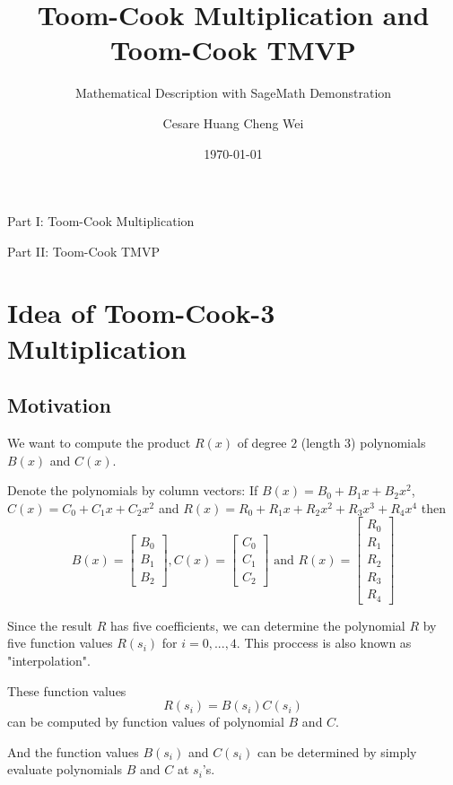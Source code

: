 \documentclass[
11pt,notheorems,hyperref={pdfauthor=whatever}
]{beamer}
\title[
]{Toom-Cook Multiplication and Toom-Cook TMVP}
\subtitle{Mathematical Description with SageMath Demonstration}
\author[
Cesare
]{
    Cesare Huang Cheng Wei 
}
\institute{
    Author Affiliation, \\
    University of Author}
\date{\today}
\begin{document}
{
\begin{frame}
  \titlepage
\end{frame}
}
\addtocounter{framenumber}{-1}

\begin{frame}{Part I: Toom-Cook Multiplication}
    \tableofcontents[part=1]
\end{frame}
\begin{frame}{Part II: Toom-Cook TMVP}
    \tableofcontents[part=2]
\end{frame}


\section{Idea of Toom-Cook-3 Multiplication}
\subsection{Motivation}
\begin{frame}
    We want to compute the product $R(x)$ of degree $2$ (length $3$) polynomials $B(x)$ and $C(x)$. 

    Denote the polynomials by column vectors: If $B(x) = B_{0} + B_{1}x+B_{2}x^{2}$, $C(x) = C_{0} + C_{1}x + C_{2} x^{2}$ and $R(x) = R_{0} + R_{1}x+R_{2}x^{2} + R_{3} x^{3} + R_{4} x^{4}$ then 
    \[
        B(x) = \begin{bmatrix} B_{0} \\ B_{1} \\ B_{2} \end{bmatrix}
        ,
        C(x) = \begin{bmatrix} C_{0} \\ C_{1} \\ C_{2} \end{bmatrix}
        \text{ and }
        R(x) = \begin{bmatrix} R_{0} \\ R_{1} \\ R_{2} \\ R_{3} \\ R_{4} \end{bmatrix}
    \]
\end{frame}

\begin{frame}
    Since the result $R$ has five coefficients, we can determine the polynomial $R$ by five function values $R(s_{i})$ for $i=0,...,4$.
    This proccess is also known as "interpolation".

    These function values
    \[R(s_{i}) = B(s_{i})C(s_{i})\]
    can be computed by function values of polynomial $B$ and $C$.

    And the function values $B(s_{i})$ and $C(s_{i})$ can be determined by simply evaluate polynomials $B$ and $C$ at $s_{i}$'s.
\end{frame}
\end{document}
